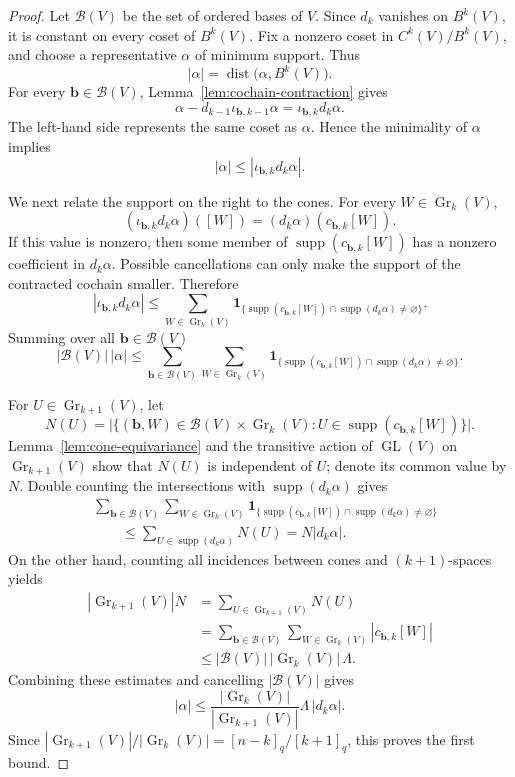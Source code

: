 \documentclass[11pt]{article}
\numberwithin{equation}{section}
\newcommand{\Gr}{\operatorname{Gr}}
\newcommand{\supp}{\operatorname{supp}}
\begin{document}
\begin{proof}
Let $\mathcal B(V)$ be the set of ordered bases of $V$. Since $d_k$
vanishes on $B^k(V)$, it is constant on every coset of $B^k(V)$.
Fix a nonzero coset in $C^k(V)/B^k(V)$, and choose a representative
$\alpha$ of minimum support. Thus
\[
 |\alpha|
 =
 \operatorname{dist}\bigl(\alpha,B^k(V)\bigr).
\]
For every $\mathbf b\in\mathcal B(V)$,
Lemma~\ref{lem:cochain-contraction} gives
\[
 \alpha-d_{k-1}\iota_{\mathbf b,k-1}\alpha
 =
 \iota_{\mathbf b,k}d_k\alpha.
\]
The left-hand side represents the same coset as $\alpha$. Hence the
minimality of $\alpha$ implies
\[
 |\alpha|\le|\iota_{\mathbf b,k}d_k\alpha|.
\]

We next relate the support on the right to the cones. For every
$W\in\Gr_k(V)$,
\[
 (\iota_{\mathbf b,k}d_k\alpha)([W])
 =
 (d_k\alpha)(c_{\mathbf b,k}[W]).
\]
If this value is nonzero, then some member of
$\supp(c_{\mathbf b,k}[W])$ has a nonzero coefficient in
$d_k\alpha$. Possible cancellations can only make the support of the
contracted cochain smaller. Therefore
\[
 |\iota_{\mathbf b,k}d_k\alpha|
 \le
 \sum_{W\in\Gr_k(V)}
 \mathbf 1_{\{
 \supp(c_{\mathbf b,k}[W])
 \cap\supp(d_k\alpha)\ne\varnothing\}}.
\]
Summing over all $\mathbf b \in \mathcal B(V) $
\[
 |\mathcal B(V)|\,|\alpha|
 \le
 \sum_{\mathbf b\in\mathcal B(V)}
 \sum_{W\in\Gr_k(V)}
 \mathbf 1_{\{
 \supp(c_{\mathbf b,k}[W])
 \cap\supp(d_k\alpha)\ne\varnothing\}}.
\]

For $U\in\Gr_{k+1}(V)$, let
\[
 N(U)
 =
 \bigl|\{(\mathbf b,W)\in\mathcal B(V)\times\Gr_k(V):
 U\in\supp(c_{\mathbf b,k}[W])\}\bigr|.
\]
Lemma~\ref{lem:cone-equivariance} and the transitive action of
$\operatorname{GL}(V)$ on $\Gr_{k+1}(V)$ show that $N(U)$ is
independent of $U$; denote its common value by $N$. Double counting
the intersections with $\supp(d_k\alpha)$ gives
\begin{align*}
 &\sum_{\mathbf b\in\mathcal B(V)}
 \sum_{W\in\Gr_k(V)}
 \mathbf 1_{\{
 \supp(c_{\mathbf b,k}[W])
 \cap\supp(d_k\alpha)\ne\varnothing\}}\\
 &\qquad\le
 \sum_{U\in\supp(d_k\alpha)}N(U)
 =
 N|d_k\alpha|.
\end{align*}
On the other hand, counting all incidences between cones and
$(k+1)$-spaces yields
\begin{align*}
 |\Gr_{k+1}(V)|N
 &=
 \sum_{U\in\Gr_{k+1}(V)}N(U)\\
 &=
 \sum_{\mathbf b\in\mathcal B(V)}
 \sum_{W\in\Gr_k(V)}
 |c_{\mathbf b,k}[W]|\\
 &\le
 |\mathcal B(V)|\,|\Gr_k(V)|\,\Lambda.
\end{align*}
Combining these estimates and cancelling $|\mathcal B(V)|$ gives
\[
 |\alpha|
 \le
 \frac{|\Gr_k(V)|}{|\Gr_{k+1}(V)|}
 \Lambda\,|d_k\alpha|.
\]
Since
$|\Gr_{k+1}(V)|/|\Gr_k(V)|=[n-k]_q/[k+1]_q$, this proves the first
bound.


\end{proof}
\end{document}

